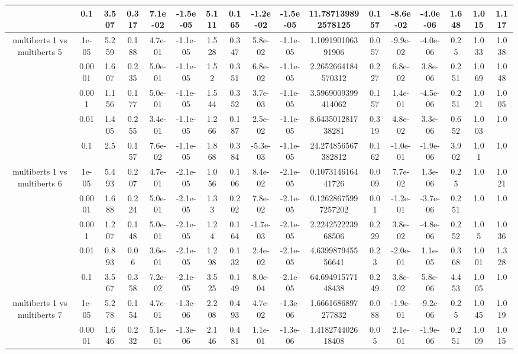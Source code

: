 \begin{tabular}{|c|c|c|c|c|c|c|c|c|c|c|c|c|c|c|c|c|}
 & 0.1 & 3.507 & 0.317 & 7.1e-02 & -1.5e-05 & 5.111 & 0.165 & -1.2e-02 & -1.5e-05 & 11.787139892578125 & 0.157 & -8.6e-02 & -4.0e-06 & 1.648 & 1.015 & 1.117 \\
\hline
\multirow{5}{*}{multiberts 1 vs multiberts 5} & 1e-05 & 5.259 & 0.188 & 4.7e-01 & -1.1e-05 & 1.528 & 0.347 & 5.8e-02 & -1.1e-05 & 1.109190106391906 & 0.057 & -9.9e-02 & -4.0e-06 & 0.25 & 1.033 & 1.038 \\
 & 0.0001 & 1.607 & 0.235 & 5.0e-01 & -1.1e-05 & 1.52 & 0.351 & 6.8e-02 & -1.1e-05 & 2.2652664184570312 & 0.227 & 6.8e-02 & 3.8e-06 & 0.251 & 1.069 & 1.048 \\
 & 0.001 & 1.156 & 0.177 & 5.0e-01 & -1.1e-05 & 1.544 & 0.352 & 3.7e-03 & -1.1e-05 & 3.5969009399414062 & 0.157 & 1.4e-01 & -4.5e-06 & 0.251 & 1.021 & 1.005 \\
 & 0.01 & 1.405 & 0.255 & 3.4e-01 & -1.1e-05 & 1.266 & 0.187 & 2.5e-02 & -1.1e-05 & 8.643501281738281 & 0.319 & 4.8e-02 & 3.3e-06 & 0.652 & 1.003 & 1.0 \\
 & 0.1 & 2.5 & 0.157 & 7.6e-02 & -1.1e-05 & 1.868 & 0.384 & -5.3e-03 & -1.1e-05 & 24.274856567382812 & 0.162 & -1.0e-01 & -1.9e-06 & 3.902 & 1.01 & 1.0 \\
\hline
\multirow{5}{*}{multiberts 1 vs multiberts 6} & 1e-05 & 5.493 & 0.207 & 4.7e-01 & -2.1e-05 & 1.056 & 0.106 & 8.4e-02 & -2.1e-05 & 0.107314616441726 & 0.009 & 7.7e-02 & 1.3e-06 & 0.25 & 1.0 & 1.021 \\
 & 0.0001 & 1.688 & 0.224 & 5.0e-01 & -2.1e-05 & 1.33 & 0.202 & 7.8e-02 & -2.1e-05 & 0.12628675997257202 & 0.01 & -1.2e-01 & -3.7e-06 & 0.251 & 1.0 & 1.0 \\
 & 0.001 & 1.207 & 0.148 & 5.0e-01 & -2.1e-05 & 1.24 & 0.164 & -1.7e-03 & -2.1e-05 & 2.224252223968506 & 0.229 & 3.8e-02 & -4.8e-06 & 0.252 & 1.05 & 1.036 \\
 & 0.01 & 0.893 & 0.06 & 3.6e-01 & -2.1e-05 & 1.298 & 0.132 & 2.4e-02 & -2.1e-05 & 4.639987945556641 & 0.23 & -2.0e-01 & 1.1e-05 & 0.368 & 1.001 & 1.328 \\
 & 0.1 & 3.567 & 0.358 & 7.2e-02 & -2.1e-05 & 3.525 & 0.149 & 8.0e-04 & -2.1e-05 & 64.69491577148438 & 0.249 & 3.8e-02 & 5.8e-06 & 4.453 & 1.005 & 1.0 \\
\hline
\multirow{5}{*}{multiberts 1 vs multiberts 7} & 1e-05 & 5.278 & 0.154 & 4.7e-01 & -1.3e-06 & 2.208 & 0.493 & 4.7e-02 & -1.3e-06 & 1.6661686897277832 & 0.088 & -1.9e-01 & -9.2e-06 & 0.25 & 1.045 & 1.019 \\
 & 0.0001 & 1.646 & 0.232 & 5.1e-01 & -1.3e-06 & 2.146 & 0.481 & 1.1e-01 & -1.3e-06 & 1.418274402618408 & 0.05 & 2.1e-01 & -1.9e-06 & 0.251 & 1.009 & 1.015 \\

\end{tabular}
